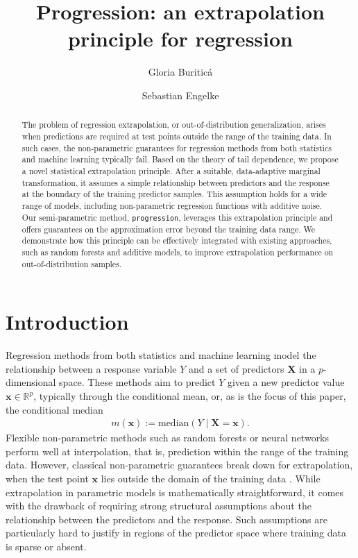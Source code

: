 \documentclass{statsoc}
\title[Progression: an extrapolation principle for regression]{Progression: an extrapolation principle for regression}
\author{Gloria Buritic\'a}
\author[G. Buritic\'a and S.~Engelke]{Sebastian Engelke}
\theoremstyle{break}
\def\g{\mathbf}
\def\M{\text{median}}
\begin{document}
\begin{abstract}
	The problem of regression extrapolation, or out-of-distribution generalization, arises when predictions are required at test points outside the range of the training data. In such cases, the non-parametric guarantees for regression methods from both statistics and machine learning typically fail. Based on the theory of tail dependence, we propose a novel statistical extrapolation principle. After a suitable, data-adaptive marginal transformation, it assumes a simple relationship between predictors and the response at the boundary of the training predictor samples. This assumption holds for a wide range of models, including non-parametric regression functions with additive noise. Our semi-parametric method, \texttt{progression}, leverages this extrapolation principle and offers guarantees on the approximation error beyond the training data range.
	We demonstrate how this principle can be effectively integrated with existing approaches, such as random forests and additive models, to improve extrapolation performance on out-of-distribution samples.
\end{abstract}





\section{Introduction}

Regression methods from both statistics and machine learning model the relationship between a response variable $Y$ and a set of predictors $\mathbf X$ in a $p$-dimensional space. These methods aim to predict $Y$ given a new predictor value $\g x\in \mathbb R^p$, typically through the conditional mean, or, as is the focus of this paper, the conditional median
\begin{align}\label{cond_median}
	 m(\g x) := \M(Y \mid \g X = \g x). 
\end{align}
Flexible non-parametric methods such as random forests or neural networks perform well at interpolation, that is, prediction within the range of the training data. 
However, classical non-parametric guarantees break down for extrapolation, when the test point $\g x$ lies outside the domain of the training data \citep{xu2021how}. While extrapolation in parametric models is mathematically straightforward, it comes with the drawback of requiring strong structural assumptions about the relationship between the predictors and the response. Such assumptions are particularly hard to justify in regions of the predictor space where training data is sparse or absent.
\end{document}
